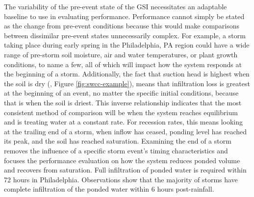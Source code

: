 The variability of the pre-event state of the GSI necessitates an adaptable baseline to use in evaluating performance.
Performance cannot simply be stated as the change from pre-event conditions because this would make comparisons between dissimilar pre-event states unnecessarily complex.
For example, a storm taking place during early spring in the Philadelphia, PA region could have a wide range of pre-storm soil moisture, air and water temperatures, or plant growth conditions, to name a few, all of which will impact how the system responds at the beginning of a storm.
Additionally, the fact that suction head is highest when the soil is dry (\cite{Eyo2020}, Figure \ref{fig:swcc-example}), means that infiltration loss is greatest at the beginning of an event, no matter the specific initial conditions, because that is when the soil is driest.
This inverse relationship indicates that the most consistent method of comparison will be when the system reaches equilibrium and is treating water at a constant rate.
For recession rates, this means looking at the trailing end of a storm, when inflow has ceased, ponding level has reached its peak, and the soil has reached saturation.
Examining the end of a storm removes the influence of a specific storm event's timing characteristics and focuses the performance evaluation on how the system reduces ponded volume and recovers from saturation.
Full infiltration of ponded water is required within 72 hours in Philadelphia.
Observations show that the majority of storms have complete infiltration of the ponded water within 6 hours post-rainfall.

